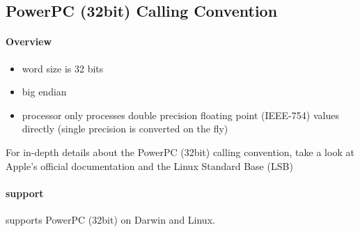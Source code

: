 %
%
%
%

\subsection{PowerPC (32bit) Calling Convention}

\paragraph{Overview}

\begin{itemize}
\item word size is 32 bits
\item big endian
\item processor only processes double precision floating point (IEEE-754) values directly (single precision is converted on the fly)
\end{itemize}
For in-depth details about the PowerPC (32bit) calling convention, take a look
at Apple's official documentation \cite{ppcMacOSX} and the Linux Standard Base
(LSB) \cite{ppc32LSB}


\paragraph{ support}

 supports PowerPC (32bit) on Darwin and Linux.


